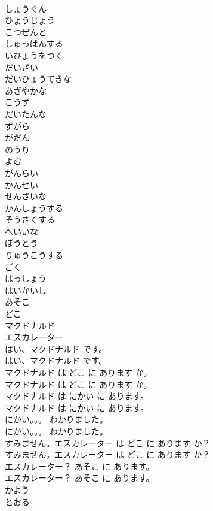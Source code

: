 \documentclass[8pt]{extreport}
\begin{document}
\begin{CJK}{UTF8}{min}
\\	しょうぐん
\\	ひょうじょう
\\	こつぜんと
\\	しゅっぱんする
\\	いひょうをつく
\\	だいざい
\\	だいひょうてきな
\\	あざやかな
\\	こうず
\\	だいたんな
\\	ずがら
\\	がだん
\\	のうり
\\	よむ
\\	がんらい
\\	かんせい
\\	せんさいな
\\	かんしょうする
\\	そうさくする
\\	へいいな
\\	ぼうとう
\\	りゅうこうする
\\	ごく
\\	はっしょう
\\	はいかいし
\\	あそこ
\\	どこ
\\	マクドナルド
\\	エスカレーター
\\	はい、マクドナルド です。
\\	はい、マクドナルド です。
\\	マクドナルド は どこ に あります か。
\\	マクドナルド は どこ に あります か。
\\	マクドナルド は にかい に あります。
\\	マクドナルド は にかい に あります。
\\	にかい。。。 わかりました。
\\	にかい。。。 わかりました。
\\	すみません。エスカレーター は どこ に あります か？
\\	すみません。エスカレーター は どこ に あります か？
\\	エスカレーター？ あそこ に あります。
\\	エスカレーター？ あそこ に あります。
\\	かよう
\\	とおる

\end{CJK}
\end{document}
